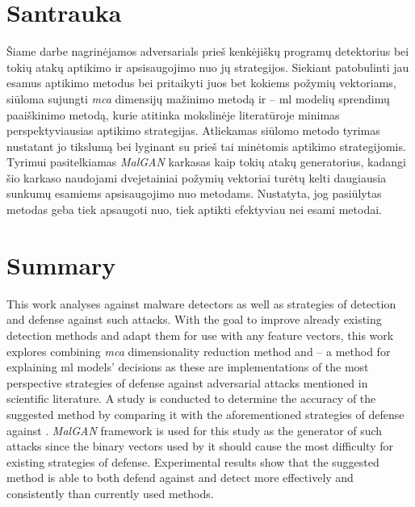 \section*{Santrauka}

Šiame darbe nagrinėjamos \glspl{adversarial} prieš kenkėjiškų programų detektorius bei tokių atakų aptikimo ir apsisaugojimo nuo jų strategijos. Siekiant patobulinti jau esamus aptikimo metodus bei pritaikyti juos bet kokiems požymių vektoriams, siūloma sujungti \textit{\gls{mca}} dimensijų mažinimo metodą ir \textit{\LIME} -- \gls{ml} modelių sprendimų paaiškinimo metodą, kurie atitinka mokslinėje literatūroje minimas perspektyviausias  aptikimo strategijas. Atliekamas siūlomo metodo tyrimas nustatant jo tikslumą bei lyginant su prieš tai minėtomis  aptikimo strategijomis. Tyrimui pasitelkiamas \textit{MalGAN} karkasas kaip tokių atakų generatorius, kadangi šio karkaso naudojami dvejetainiai požymių vektoriai turėtų kelti daugiausia sunkumų esamiems apsisaugojimo nuo  metodams. Nustatyta, jog pasiūlytas metodas geba tiek apsaugoti nuo, tiek aptikti  efektyviau nei esami metodai. 

\clearpage
\section*{Summary}

This work analyses  against malware detectors as well as strategies of detection and defense against such attacks. With the goal to improve already existing detection methods and adapt them for use with any feature vectors, this work explores combining \textit{\gls{mca}} dimensionality reduction method and \textit{\LIME} -- a method for explaining \gls{ml} models' decisions as these are implementations of the most perspective strategies of defense against adversarial attacks mentioned in scientific literature. A study is conducted to determine the accuracy of the suggested method by comparing it with the aforementioned strategies of defense against . \textit{MalGAN} framework is used for this study as the generator of such attacks since the binary vectors used by it should cause the most difficulty for existing strategies of defense. Experimental results show that the suggested method is able to both defend against and detect  more effectively and consistently than currently used methods.
